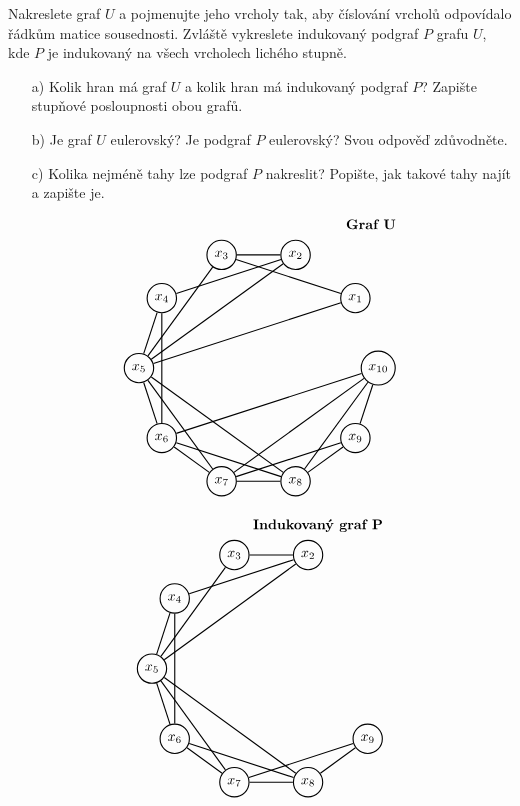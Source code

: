 \documentclass[a4paper, 10pt, oneside]{article}       %
\begin{document}
Nakreslete graf $U$ a pojmenujte jeho vrcholy tak, aby číslování vrcholů odpovídalo řádkům matice sousednosti. Zvláště vykreslete indukovaný podgraf $P$ grafu $U$, kde $P$ je indukovaný na všech vrcholech lichého stupně.

\begin{enumerate}
    \item[a)] Kolik hran má graf $U$ a kolik hran má indukovaný podgraf $P$? Zapište stupňové posloupnosti obou grafů.
    \item[b)] Je graf $U$ eulerovský? Je podgraf $P$ eulerovský? Svou odpověď zdůvodněte.
    \item[c)] Kolika nejméně tahy lze podgraf $P$ nakreslit? Popište, jak takové tahy najít a zapište je.
\end{enumerate}

\begin{multicols}{2}
\begin{align*}
    \text{\textbf{Graf U}} \\
    \begin{tikzpicture}[node distance={15mm}, thick, main/.style = {draw, circle}]
    \foreach \i in {1,...,10} {
        \node[main] (x\i) at (360/10*\i:3) {$x_{\i}$};
    }
    \draw (x3) -- (x1);
    \draw (x5) -- (x1);
    \draw (x3) -- (x2);
    \draw (x4) -- (x2);
    \draw (x5) -- (x2);
    \draw (x5) -- (x3);
    \draw (x5) -- (x4);
    \draw (x6) -- (x4);
    \draw (x6) -- (x5);
    \draw (x7) -- (x5);
    \draw (x8) -- (x5);
    \draw (x7) -- (x6);
    \draw (x8) -- (x6);
    \draw (x10) -- (x6);
    \draw (x8) -- (x7);
    \draw (x9) -- (x7);
    \draw (x10) -- (x7);
    \draw (x9) -- (x8);
    \draw (x10) -- (x8);
    \draw (x10) -- (x9);
    \end{tikzpicture} 
\end{align*}

\begin{align*}
    \text{\textbf{Indukovaný graf P}}\\
    \begin{tikzpicture}[node distance={15mm}, thick, main/.style = {draw, circle}]
    \foreach \i in {2,...,9} {
        \node[main] (x\i) at (360/10*\i:3) {$x_{\i}$};
    }
    \draw (x3) -- (x2);
    \draw (x4) -- (x2);
    \draw (x5) -- (x2);
    \draw (x5) -- (x3);
    \draw (x5) -- (x4);
    \draw (x6) -- (x4);
    \draw (x6) -- (x5);
    \draw (x7) -- (x5);
    \draw (x8) -- (x5);
    \draw (x7) -- (x6);
    \draw (x8) -- (x6);
    \draw (x8) -- (x7);
    \draw (x9) -- (x7);
    \draw (x9) -- (x8);
    \end{tikzpicture} 
\end{align*}
\end{multicols}
\end{document}
